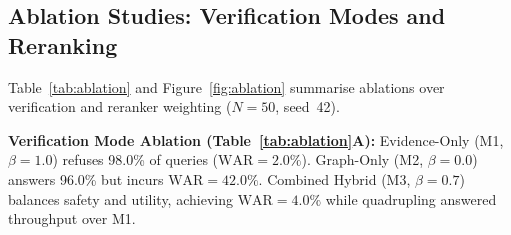 \documentclass[preprint,12pt,a4paper]{elsarticle}
\begin{document}
\begin{table}[!htbp]
\singlespacing
\centering
\small
\setlength{\tabcolsep}{5pt}
\caption{Matched-threshold ($\tau=0.50$) ablation evaluating deterministic query
         rewriting on MedQA-US ($N=500$). Rewriting expands coverage by +3.2--3.4 pp
         while maintaining $\text{WAR} \leq 10\%$.
         Source: \texttt{step18\_scaled\_n500.json} $\to$ \texttt{matched\_tau\_comparison}.}
\label{tab:matched_tau}
\end{table}

\subsection{Ablation Studies: Verification Modes and Reranking}
\label{sec:ablation}

Table~\ref{tab:ablation} and Figure~\ref{fig:ablation} summarise ablations over verification and reranker weighting
($N=50$, seed~42).

\textbf{Verification Mode Ablation (Table~\ref{tab:ablation}A):} Evidence-Only (M1,
$\beta=1.0$) refuses 98.0\% of queries ($\text{WAR}=2.0\%$). Graph-Only (M2, $\beta=0.0$)
answers 96.0\% but incurs $\text{WAR}=42.0\%$. Combined Hybrid (M3, $\beta=0.7$) balances
safety and utility, achieving $\text{WAR}=4.0\%$ while quadrupling answered throughput over M1.
\end{document}
